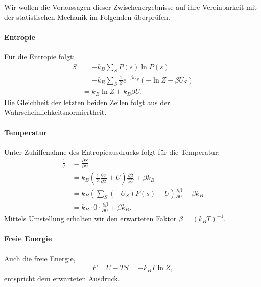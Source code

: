 Wir wollen die Voraussagen dieser Zwischenergebnisse auf ihre Vereinbarkeit mit der statistischen Mechanik im Folgenden überprüfen. 
\paragraph*{Entropie} Für die Entropie folgt:
\begin{align*}
    S&=-k_B\sum_S P(s)\ln P(s)\\
    &=-k_B\sum_S \frac{1}{Z}e^{-\beta U_S}(-\ln Z-\beta U_S)\\
    &=k_B \ln Z+k_B \beta U.
\end{align*}
Die Gleichheit der letzten beiden Zeilen folgt aus der Wahrscheinlichkeitsnormiertheit.
\paragraph*{Temperatur} Unter Zuhilfenahme des Entropieausdrucks folgt für die Temperatur:
\begin{align*}
    \frac{1}{T}&=\frac{\partial S}{\partial U}\\
    &=k_B\left(\frac{1}{Z}\frac{\partial Z}{\partial \beta}+U\right)\frac{\partial \beta}{\partial U}+\beta k_B\\
    &=k_B\left(\sum_S (-U_S)P(s)+U\right)\frac{\partial \beta}{\partial U}+\beta k_B\\
    &=k_B\cdot 0\cdot\frac{\partial \beta}{\partial U}+\beta k_B.
\end{align*}
Mittels Umstellung erhalten wir den erwarteten Faktor $\beta=(k_B T)^{-1}$.
\paragraph*{Freie Energie} Auch die freie Energie,
\begin{align*}
    F=U-TS=-k_B T \ln Z,
\end{align*}
entspricht dem erwarteten Ausdruck.
